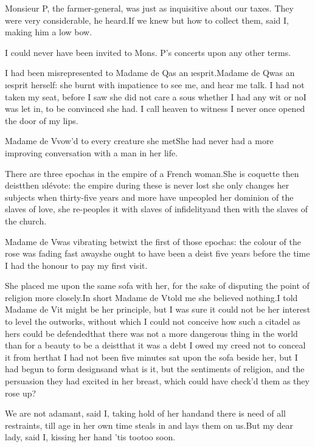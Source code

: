 \documentclass[twoside]{article}
\begin{document}
Monsieur P\tskk , the farmer-general, was
just as inquisitive about our taxes.  They
were very considerable, he heard.\tskk If
we knew but how to collect them, said I,
making him a low bow.

I could never have been invited to Mons.
P\tskk ’s concerts upon any other terms.

I had been misrepresented to Madame de
Q\tskk  as an \i{esprit}.\tskk Madame de
Q\tskk  was an \i{esprit} herself: she
burnt with impatience to see me, and hear
me talk.  I had not taken my seat, before
I saw she did not care a sous whether I
had any wit or no\tskk I was let in, to
be convinced she had.  I call heaven to
witness I never once opened the door of my
lips.

Madame de V\tskk  vow’d to every creature
she met\tskk \lqq She had never had a more
improving conversation with a man in her
life.\rqq 

There are three epochas in the empire of a
French woman.\tskk She is coquette\tskk
then deist\tskk then \i{dévote}: the
empire during these is never lost\tskk
she only changes her subjects when
thirty-five years and more have unpeopled
her dominion of the slaves of love, she
re-peoples it with slaves of
infidelity\tskk and then with the slaves
of the church.

Madame de V\tskk  was vibrating betwixt
the first of those epochas: the colour of
the rose was fading fast away\tskk she
ought to have been a deist five years
before the time I had the honour to pay my
first visit.

She placed me upon the same sofa with her,
for the sake of disputing the point of
religion more closely.\tskk In short
Madame de V\tskk  told me she believed
nothing.\tskk I told Madame de V\tskk  it
might be her principle, but I was sure it
could not be her interest to level the
outworks, without which I could not
conceive how such a citadel as hers could
be defended\tskk that there was not a
more dangerous thing in the world than for
a beauty to be a deist\tskk that it was a
debt I owed my creed not to conceal it
from her\tskk that I had not been five
minutes sat upon the sofa beside her, but
I had begun to form designs\tskk and what
is it, but the sentiments of religion, and
the persuasion they had excited in her
breast, which could have check’d them as
they rose up?

We are not adamant, said I, taking hold of
her hand\tskk and there is need of all
restraints, till age in her own time
steals in and lays them on us.\tskk But my
dear lady, said I, kissing her hand\tskk
’tis too\tskk too soon.
\end{document}
